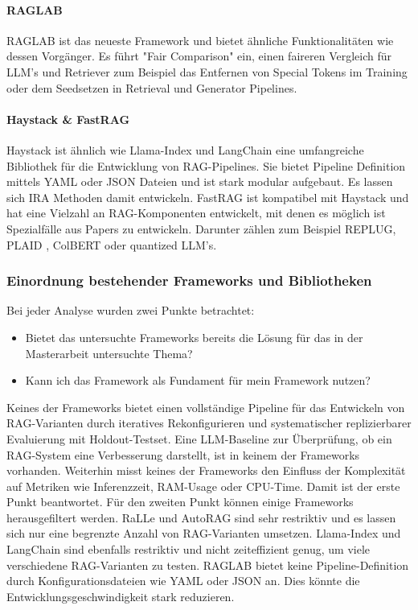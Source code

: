 \documentclass[letterpaper, 10 pt, conference]{ieeeconf}
\begin{document}
\paragraph{RAGLAB\cite{zhang-etal-2024-raglab}}
RAGLAB ist das neueste Framework und bietet ähnliche Funktionalitäten wie dessen Vorgänger. Es führt "Fair Comparison" ein, einen faireren Vergleich für LLM's und Retriever zum Beispiel das Entfernen von Special Tokens im Training oder dem Seedsetzen in Retrieval und Generator Pipelines.


\paragraph{Haystack\cite{Pietsch_Haystack_the_end-to-end_2019} \& FastRAG \cite{Izsak_fastRAG_Efficient_Retrieval_2023}}
Haystack ist ähnlich wie Llama-Index und LangChain eine umfangreiche Bibliothek für die Entwicklung von RAG-Pipelines. Sie bietet Pipeline Definition mittels YAML oder JSON Dateien und ist stark modular aufgebaut. Es lassen sich IRA Methoden damit entwickeln. 
FastRAG ist kompatibel mit Haystack und hat eine Vielzahl an RAG-Komponenten entwickelt, mit denen es möglich ist Spezialfälle aus Papers zu entwickeln. 
Darunter zählen zum Beispiel REPLUG\cite{shi2023replugretrievalaugmentedblackboxlanguage}, PLAID \cite{santhanam2022plaidefficientenginelate}, ColBERT\cite{santhanam2022colbertv2effectiveefficientretrieval} oder quantized LLM's.\\

\subsubsection{Einordnung bestehender Frameworks und Bibliotheken}

Bei jeder Analyse wurden zwei Punkte betrachtet:\\
\begin{itemize}
   \item Bietet das untersuchte Frameworks bereits die Lösung für das in der Masterarbeit untersuchte Thema?
   \item Kann ich das Framework als Fundament für mein Framework nutzen?\\
\end{itemize}

Keines der Frameworks bietet einen vollständige Pipeline für das Entwickeln von RAG-Varianten durch iteratives Rekonfigurieren und systematischer replizierbarer Evaluierung mit Holdout-Testset. 
Eine LLM-Baseline zur Überprüfung, ob ein RAG-System eine Verbesserung darstellt, ist in keinem der Frameworks vorhanden.
Weiterhin misst keines der Frameworks den Einfluss der Komplexität auf Metriken wie Inferenzzeit, RAM-Usage oder CPU-Time. 
Damit ist der erste Punkt beantwortet. Für den zweiten Punkt können einige Frameworks herausgefiltert werden.
RaLLe und AutoRAG sind sehr restriktiv und es lassen sich nur eine begrenzte Anzahl von RAG-Varianten umsetzen. Llama-Index und LangChain sind ebenfalls restriktiv und nicht zeiteffizient genug, um viele verschiedene RAG-Varianten zu testen.
RAGLAB bietet keine Pipeline-Definition durch Konfigurationsdateien wie YAML oder JSON an. Dies könnte die Entwicklungsgeschwindigkeit stark reduzieren.
\end{document}
